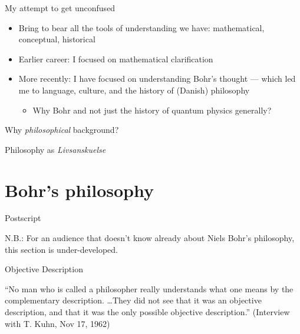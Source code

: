 \documentclass[fleqn]{beamer}
\begin{document}
\begin{frame}{My attempt to get unconfused}

  \begin{itemize}
  \item Bring to bear all the tools of understanding we have:
    mathematical, conceptual, historical
  \item Earlier career: I focused on mathematical clarification
  \item More recently: I have focused on understanding Bohr's thought
    --- which led me to language, culture, and the history of (Danish)
    philosophy
    \begin{itemize}
    \item Why Bohr and not just the history of quantum physics
      generally?
    \end{itemize}
  \end{itemize}

\end{frame}

\begin{frame}{Why \emph{philosophical} background?}

  {\Huge Philosophy as \emph{Livsanskuelse} }



\end{frame}

\section{Bohr's philosophy}

\begin{frame}{Postscript}

  N.B.: For an audience that doesn't know already about Niels Bohr's
  philosophy, this section is under-developed.



\end{frame}

\begin{frame}{Objective Description}
  
  ``No man who is called a philosopher really understands what one
  means by the complementary description. \dots They did not see that
  it was an objective description, and that it was the only possible
  objective description.'' (Interview with T. Kuhn, Nov 17, 1962)

\end{frame}
\end{document}
